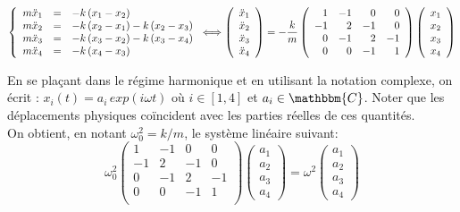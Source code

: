 \documentclass[a4paper, 12pt]{article}
\begin{document}
$$
\left \{
\begin{array}{r c l}
m \ddot x_1 &=& -k \, (x_1-x_2)  \\
m \ddot x_2 &=& -k \, (x_2-x_1)  -k \, (x_2-x_3) \\
m \ddot x_3  &=&  -k \,(x_3-x_2) -k \,(x_3-x_4)\\
m \ddot x_4 &=& -k \, (x_4-x_3)  
\end{array}
\right .
\Longleftrightarrow
\left(
\begin{array}{c}
 \ddot x_1 \\  \ddot x_2 \\  \ddot x_3 \\  \ddot x_4
\end{array}
\right) = - {k \over m}
\left(
\begin{array}{rrrr}
1   & -1 & 0  & 0  \\
-1  & 2 & -1 & 0 \\
0  & -1 & 2 & -1 \\
0  & 0 & -1 & 1 \\
\end{array}
\right)
\left(
\begin{array}{c}
x_1 \\ x_2 \\ x_3 \\ x_4
\end{array}
\right)
$$

En se plaçant dans le régime harmonique et en utilisant
la notation complexe, on écrit : $x_i(t)=a_i \, exp(i\omega t)$ où $i \in [1, 4]$ et $a_i \in \mathbbm{C}$.
Noter que les déplacements physiques coïncident avec les parties réelles de ces quantités.\\

On obtient, en notant ${\omega_0^2}=k/m$, le système linéaire suivant:
$$
{\omega_0^2}
\left(
\begin{array}{rrrr}
1   & -1 & 0  & 0  \\
-1  & 2 & -1 & 0 \\
0  & -1 & 2 & -1 \\
0  & 0 & -1 & 1 \\
\end{array}
\right)
\left(
\begin{array}{c}
a_1 \\ a_2 \\ a_3 \\ a_4
\end{array}
\right)=
{\omega^2}
\left(
\begin{array}{c}
a_1 \\ a_2 \\ a_3 \\ a_4
\end{array}
\right) 
$$
\end{document}

